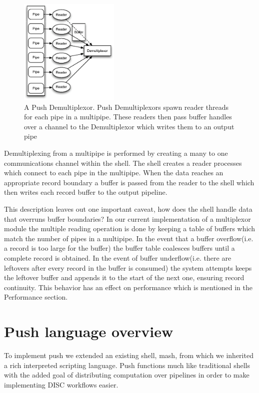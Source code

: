 \documentclass[10pt,conference,letterpaper]{IEEEtran}
\begin{document}
\begin{figure}[htp]
\centering
\includegraphics[height=2.0in]{demux.eps}
\caption{A Push Demultiplexor. Push Demultiplexors spawn reader threads for each pipe in a multipipe. These readers then pass buffer handles over a channel to the Demultiplexor which writes them to an output pipe}\label{fig:demux}
\end{figure}
Demultiplexing from a multipipe is performed by creating a many to one communications channel within the shell. The shell creates a reader processes which connect to each pipe in the multipipe. When the data reaches an appropriate record boundary a buffer is passed from the reader to the shell which then writes each record buffer to the output pipeline. 

This description leaves out one important caveat, how does the shell handle data that overruns buffer boundaries? In our current implementation of a multiplexor module the multiple reading operation is done by keeping a table of buffers which match the number of pipes in a multipipe. In the event that a buffer overflow(i.e. a record is too large for the buffer) the buffer table coalesces buffers until a complete record is obtained. In the event of buffer underflow(i.e. there are leftovers after every record in the buffer is consumed) the system attempts keeps the leftover buffer and appends it to the start of the next one, ensuring record continuity. This behavior has an effect on performance which is mentioned in the Performance section. 

\section{Push language overview}

To implement push we extended an existing shell, mash\cite{mashman}, from which we inherited a rich interpreted scripting language. Push functions much like traditional shells with the added goal of distributing computation over pipelines in order to make implementing DISC workflows easier. 
\end{document}
